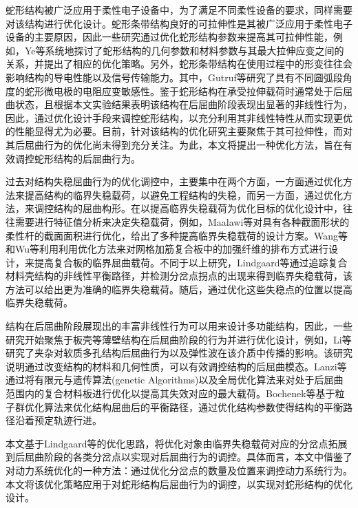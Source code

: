 蛇形结构被广泛应用于柔性电子设备中，为了满足不同柔性设备的要求，同样需要对该结构进行优化设计。蛇形条带结构良好的可拉伸性是其被广泛应用于柔性电子设备的主要原因，因此一些研究通过优化蛇形结构参数来提高其可拉伸性能，例如，Ye等\cite{ye2022automatic}系统地探讨了蛇形结构的几何参数和材料参数与其最大拉伸应变之间的关系，并提出了相应的优化策略。另外，蛇形条带结构在使用过程中的形变往往会影响结构的导电性能以及信号传输能力\cite{han2022electrical}。其中，Gutruf等\cite{gutruf2014strain}研究了具有不同圆弧段角度的蛇形微电极的电阻应变敏感性。鉴于蛇形结构在承受拉伸载荷时通常处于后屈曲状态，且根据本文实验结果表明该结构在后屈曲阶段表现出显著的非线性行为，因此，通过优化设计手段来调控蛇形结构，以充分利用其非线性特性从而实现更优的性能显得尤为必要。目前，针对该结构的优化研究主要聚焦于其可拉伸性，而对其后屈曲行为的优化尚未得到充分关注。为此，本文将提出一种优化方法，旨在有效调控蛇形结构的后屈曲行为。

过去对结构失稳屈曲行为的优化调控中，主要集中在两个方面，一方面通过优化方法来提高结构的临界失稳载荷，以避免工程结构的失稳，而另一方面，通过优化方法，来调控结构的屈曲构形。在以提高临界失稳载荷为优化目标的优化设计中，往往需要进行特征值分析来决定失稳载荷，例如，Maalawi等\cite{maalawi2002buckling}对具有各种截面形状的柔性杆的截面面积进行优化，给出了多种提高临界失稳载荷的设计方案。Wang等\cite{wang2017buckling}和Wu等\cite{wu2015framework}利用利用优化方法来对网格加筋复合板中的加强纤维的排布方式进行设计，来提高复合板的临界屈曲载荷。不同于以上研究，Lindgaard等\cite{lindgaard2011unified}通过追踪复合材料壳结构的非线性平衡路径，并检测分岔点拐点的出现来得到临界失稳载荷，该方法可以给出更为准确的临界失稳载荷。随后，通过优化这些失稳点的位置以提高临界失稳载荷。

结构在后屈曲阶段展现出的丰富非线性行为可以用来设计多功能结构，因此，一些研究开始聚焦于板壳等薄壁结构在后屈曲阶段的行为并进行优化设计，例如，Li等\cite{li2019harnessing}研究了夹杂对软质多孔结构后屈曲行为以及弹性波在该介质中传播的影响。该研究说明通过改变结构的材料和几何性质，可以有效调控结构的后屈曲模态。Lanzi等\cite{lanzi2006post}通过将有限元与遗传算法(genetic Algorithms)以及全局优化算法来对处于后屈曲范围内的复合材料板进行优化以提高其失效对应的最大载荷。Bochenek等\cite{bochenek2006structural}基于粒子群优化算法来优化结构屈曲后的平衡路径，通过优化结构参数使得结构的平衡路径沿着预定轨迹行进。

本文基于Lindgaard等\cite{lindgaard2011unified}的优化思路，将优化对象由临界失稳载荷对应的分岔点拓展到后屈曲阶段的各类分岔点以实现对后屈曲行为的调控。具体而言，本文中借鉴了对动力系统优化的一种方法：通过优化分岔点的数量及位置来调控动力系统行为\cite{melot:hal-04378993}。本文将该优化策略应用于对蛇形结构后屈曲行为的调控，以实现对蛇形结构的优化设计。
